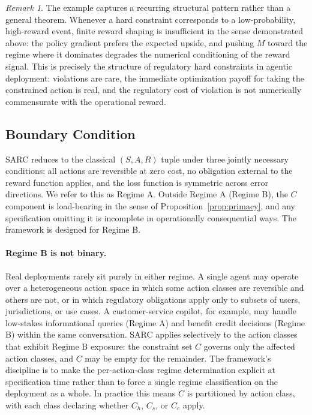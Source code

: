 \documentclass[11pt,a4paper]{article}
\theoremstyle{remark}
\newtheorem*{remark}{Remark}
\begin{document}
\begin{remark}
The example captures a recurring structural pattern rather than a general theorem. Whenever a hard constraint corresponds to a low-probability, high-reward event, finite reward shaping is insufficient in the sense demonstrated above: the policy gradient prefers the expected upside, and pushing $M$ toward the regime where it dominates degrades the numerical conditioning of the reward signal. This is precisely the structure of regulatory hard constraints in agentic deployment: violations are rare, the immediate optimization payoff for taking the constrained action is real, and the regulatory cost of violation is not numerically commensurate with the operational reward.
\end{remark}

\subsection{Boundary Condition}\label{sec:boundary}

SARC reduces to the classical $(S, A, R)$ tuple under three jointly necessary conditions: all actions are reversible at zero cost, no obligation external to the reward function applies, and the loss function is symmetric across error directions. We refer to this as Regime A. Outside Regime A (Regime B), the $C$ component is load-bearing in the sense of Proposition~\ref{prop:primacy}, and any specification omitting it is incomplete in operationally consequential ways. The framework is designed for Regime B.

\paragraph{Regime B is not binary.} Real deployments rarely sit purely in either regime. A single agent may operate over a heterogeneous action space in which some action classes are reversible and others are not, or in which regulatory obligations apply only to subsets of users, jurisdictions, or use cases. A customer-service copilot, for example, may handle low-stakes informational queries (Regime A) and benefit credit decisions (Regime B) within the same conversation. SARC applies selectively to the action classes that exhibit Regime B exposure: the constraint set $C$ governs only the affected action classes, and $C$ may be empty for the remainder. The framework's discipline is to make the per-action-class regime determination explicit at specification time rather than to force a single regime classification on the deployment as a whole. In practice this means $C$ is partitioned by action class, with each class declaring whether $C_h$, $C_s$, or $C_e$ apply.
\end{document}
